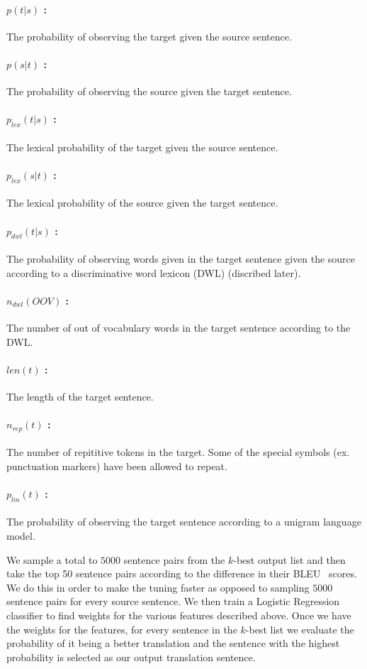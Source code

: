 \documentclass[11pt]{article}
\numberwithin{equation}{section}
\begin{document}
\paragraph{$p(t|s)$ :} The probability of observing the target given the source sentence.
\paragraph{$p(s|t)$ :} The probability of observing the source given the target sentence.
\paragraph{$p_{lex}(t|s)$ :} The lexical probability of the target given the source sentence.
\paragraph{$p_{lex}(s|t)$ :} The lexical probability of the source given the target sentence.
\paragraph{$p_{dwl}(t|s)$ :} The probability of observing words given in the target sentence given the source according to a discriminative word lexicon (DWL) (discribed later).
\paragraph{$n_{dwl}(OOV)$ :} The number of out of vocabulary words in the target sentence according to the DWL.
\paragraph{$len(t)$ :} The length of the target sentence.
\paragraph{$n_{rep}(t)$ :} The number of repititive tokens in the target. Some of the special symbols (ex. punctuation markers) have been allowed to repeat.
\paragraph{$p_{lm}(t)$ :} The probability of observing the target sentence according to a unigram language model.

We sample a total to $5000$ sentence pairs from the $k$-best output list and then take the top 50 sentence pairs according to the
difference in their BLEU~\cite{Papineni:2002:BMA:1073083.1073135} scores. We do this in order to make the tuning faster as opposed to 
sampling $5000$ sentence pairs for every source sentence. We then train a Logistic Regression classifier to find weights for the
various features described above. Once we have the weights for the features, for every sentence in the $k$-best list we evaluate the 
probability of it being a better translation and the sentence with the highest probability is selected as our output translation 
sentence.
\end{document}
